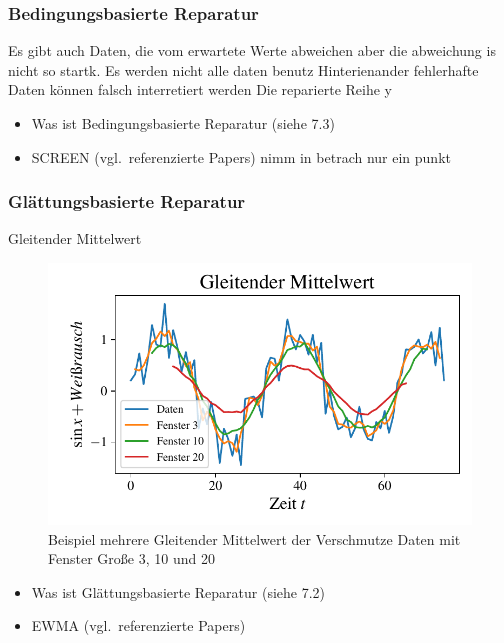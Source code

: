 \subsubsection{Bedingungsbasierte Reparatur}
Es gibt auch Daten, die vom erwartete Werte abweichen aber die abweichung is
nicht so startk. 
Es werden nicht alle daten benutz
Hinterienander fehlerhafte Daten können falsch interretiert werden
Die reparierte Reihe y

\begin{itemize}
  \item Was ist Bedingungsbasierte Reparatur (siehe 7.3)
  \item SCREEN (vgl.\ referenzierte Papers) 
  nimm in betrach nur ein punkt
\end{itemize}
\subsubsection{Glättungsbasierte Reparatur}
Gleitender Mittelwert
\begin{figure}[h]
      \centering
      \includegraphics[width=\textwidth,keepaspectratio]{../plots/Gleitender_Mittelwert.pdf}
      \caption{Beispiel mehrere Gleitender Mittelwert der 
      Verschmutze Daten mit Fenster Große 3, 10 und 20}
      \label{fig:rolling}
\end{figure}
\begin{itemize}
  \item Was ist Glättungsbasierte Reparatur (siehe 7.2)
  \item EWMA (vgl.\ referenzierte Papers) 
\end{itemize}

